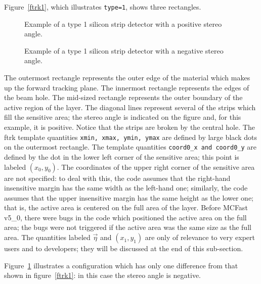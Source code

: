 Figure~\ref{ftrk1}, which illustrates {\tt type=1}, 
shows three rectangles.
% 
\begin{figure} [htbp]
\centerline{\epsfysize=3.0in }
\caption{\label{ftrk1} Example of a type 1 silicon strip detector with 
a positive stereo angle.
}
\centerline{\epsfysize=3.0in }
\caption{\label{ftrk2} Example of a type 1 silicon strip detector with 
a negative stereo angle.
}
\end{figure}
%
The outermost
rectangle represents the outer edge of the material which makes up
the forward tracking plane.  The innermost rectangle represents
the edges of the beam hole.  The mid-sized rectangle
represents the outer boundary of the
active region of the layer. The diagonal
lines represent several of the strips which fill the sensitive
area; the stereo angle is indicated on the figure and, for this example,
it is positive.  Notice that the strips are broken by the central
hole.  The ftrk template quantities {\tt xmin, xmax, ymin, ymax} 
are defined by large black dots on the outermost rectangle.  The
template quantities
{\tt coord0\_x and coord0\_y} are defined by the dot in the lower
left corner of the sensitive area; this point is labeled
$(x_0,y_0)$.  The coordinates of the upper right corner of the sensitive
area are not specified: to deal with this, the code assumes that the 
right-hand insensitive margin has the same width as the left-hand one; 
similarly, the code assumes that the upper insensitive margin has the 
same height as the lower one; that is, the active area is centered
on the full area of the layer.
Before MCFast v5\_0, there were bugs in the code which positioned the
active area on the full area; the bugs were not triggered if the active
area was the same size as the full area.
The quantities labeled $\vec{\eta}$ and
$(x_1,y_1)$ are only of relevance to very expert users and
to developers; they will be discussed at the end of this sub-section.

Figure~\ref{ftrk2} illustrates a configuration which has only
one difference from that shown in figure~\ref{ftrk1}: in this
case the stereo angle is negative.

